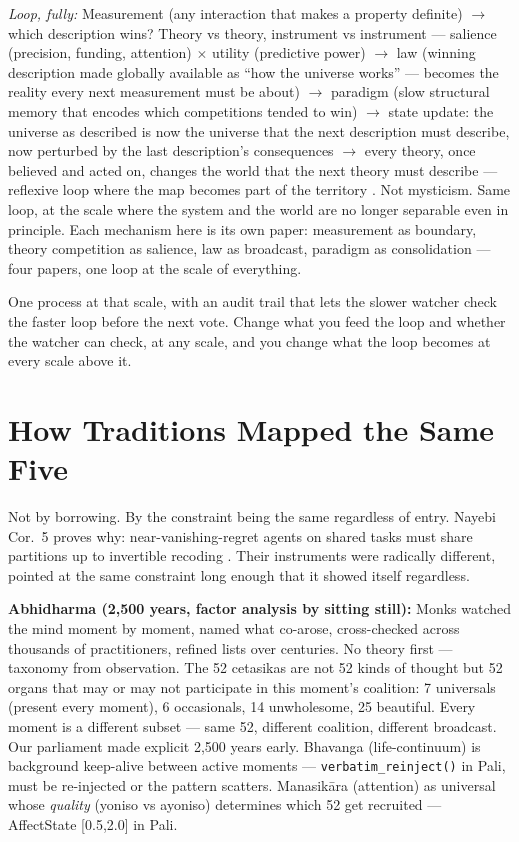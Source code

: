 \documentclass[11pt]{article}
\begin{document}
\textit{Loop, fully:} Measurement (any interaction that makes a property definite) $\to$ which description wins? Theory vs theory, instrument vs instrument --- salience (precision, funding, attention) $\times$ utility (predictive power) $\to$ law (winning description made globally available as ``how the universe works'' --- becomes the reality every next measurement must be about) $\to$ paradigm (slow structural memory that encodes which competitions tended to win) $\to$ state update: the universe as described is now the universe that the next description must describe, now perturbed by the last description's consequences $\to$ every theory, once believed and acted on, changes the world that the next theory must describe --- reflexive loop where the map becomes part of the territory \citep{nayebi2026}. Not mysticism. Same loop, at the scale where the system and the world are no longer separable even in principle. Each mechanism here is its own paper: measurement as boundary, theory competition as salience, law as broadcast, paradigm as consolidation --- four papers, one loop at the scale of everything.

One process at that scale, with an audit trail that lets the slower watcher check the faster loop before the next vote. Change what you feed the loop and whether the watcher can check, at any scale, and you change what the loop becomes at every scale above it.

\section{How Traditions Mapped the Same Five}
\label{sec:traditions}

Not by borrowing. By the constraint being the same regardless of entry. Nayebi Cor.~5 proves why: near-vanishing-regret agents on shared tasks must share partitions up to invertible recoding \citep{nayebi2026}. Their instruments were radically different, pointed at the same constraint long enough that it showed itself regardless.

\textbf{Abhidharma (2,500 years, factor analysis by sitting still):} Monks watched the mind moment by moment, named what co-arose, cross-checked across thousands of practitioners, refined lists over centuries. No theory first --- taxonomy from observation. The 52 cetasikas are not 52 kinds of thought but 52 organs that may or may not participate in this moment's coalition: 7 universals (present every moment), 6 occasionals, 14 unwholesome, 25 beautiful. Every moment is a different subset --- same 52, different coalition, different broadcast. Our parliament made explicit 2,500 years early. Bhavanga (life-continuum) is background keep-alive between active moments --- \texttt{verbatim\_reinject()} in Pali, must be re-injected or the pattern scatters. Manasik\=ara (attention) as universal whose \emph{quality} (yoniso vs ayoniso) determines which 52 get recruited --- AffectState [0.5,2.0] in Pali.
\end{document}

